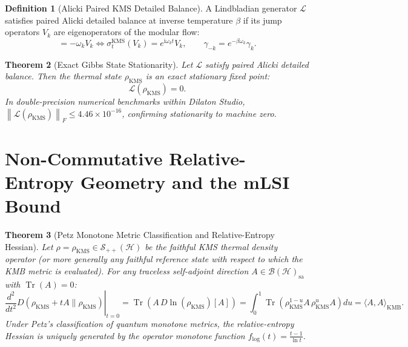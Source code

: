 \documentclass[11pt,a4paper]{article}
\theoremstyle{plain}
\newtheorem{theorem}{Theorem}[section]
\theoremstyle{definition}
\newtheorem{definition}[theorem]{Definition}
\DeclareMathOperator{\Tr}{Tr}
\newcommand{\KMS}{\mathrm{KMS}}
\newcommand{\norm}[1]{\left\lVert #1 \right\rVert}
\begin{document}
\begin{definition}[Alicki Paired KMS Detailed Balance]
A Lindbladian generator $\mathcal{L}$ satisfies paired Alicki detailed balance at inverse temperature $\beta$ if its jump operators $V_k$ are eigenoperators of the modular flow:
\begin{equation}
[H, V_k] = -\omega_k V_k \iff \sigma_t^{\KMS}(V_k) = e^{\mathrm{i} \omega_k t} V_k, \qquad \gamma_{-k} = e^{-\beta \omega_k} \gamma_k.
\end{equation}
\end{definition}

\begin{theorem}[Exact Gibbs State Stationarity]
Let $\mathcal{L}$ satisfy paired Alicki detailed balance. Then the thermal state $\rho_{\KMS}$ is an exact stationary fixed point:
\begin{equation}
\mathcal{L}(\rho_{\KMS}) = 0.
\end{equation}
In double-precision numerical benchmarks within Dilaton Studio, $\norm{\mathcal{L}(\rho_{\KMS})}_F \le 4.46 \times 10^{-16}$, confirming stationarity to machine zero.
\end{theorem}

\section{Non-Commutative Relative-Entropy Geometry and the mLSI Bound}

\begin{theorem}[Petz Monotone Metric Classification and Relative-Entropy Hessian]
Let $\rho = \rho_{\KMS} \in \mathcal{S}_{++}(\mathcal{H})$ be the faithful KMS thermal density operator (or more generally any faithful reference state with respect to which the KMB metric is evaluated). For any traceless self-adjoint direction $A \in \mathcal{B}(\mathcal{H})_{\mathrm{sa}}$ with $\Tr(A) = 0$:
\begin{equation}
\left. \frac{d^2}{dt^2} D(\rho_{\KMS} + t A \parallel \rho_{\KMS}) \right|_{t=0} = \Tr\left( A \, D\ln(\rho_{\KMS})[A] \right) = \int_0^1 \Tr\left( \rho_{\KMS}^{1-u} A \, \rho_{\KMS}^u A \right) du = \langle A, A \rangle_{\mathrm{KMB}}.
\end{equation}
Under Petz's classification of quantum monotone metrics, the relative-entropy Hessian is uniquely generated by the operator monotone function $f_{\mathrm{log}}(t) = \frac{t - 1}{\ln t}$.
\end{theorem}
\end{document}
